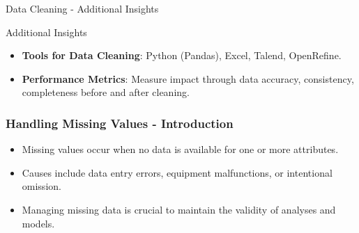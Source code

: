 \documentclass[aspectratio=169]{beamer}
\begin{document}
\begin{frame}[fragile]{Data Cleaning - Additional Insights}
    \begin{block}{Additional Insights}
        \begin{itemize}
            \item \textbf{Tools for Data Cleaning}: Python (Pandas), Excel, Talend, OpenRefine.
            \item \textbf{Performance Metrics}: Measure impact through data accuracy, consistency, completeness before and after cleaning.
        \end{itemize}
    \end{block}
\end{frame}

\begin{frame}[fragile]
    \frametitle{Handling Missing Values - Introduction}
    \begin{itemize}
        \item Missing values occur when no data is available for one or more attributes.
        \item Causes include data entry errors, equipment malfunctions, or intentional omission.
        \item Managing missing data is crucial to maintain the validity of analyses and models.
    \end{itemize}
\end{frame}
\end{document}
